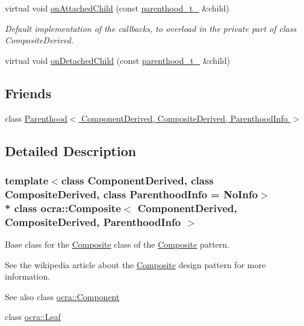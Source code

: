 {\bf }\par
\begin{DoxyCompactItemize}
\item 
virtual void \hyperlink{classocra_1_1Composite_a9937c32827a7c7f3caede800fbe7741e}{on\+Attached\+Child} (const \hyperlink{classocra_1_1Parenthood}{parenthood\+\_\+t\+\_\+} \&child)
\begin{DoxyCompactList}\small\item\em Default implementation of the callbacks, to overload in the private part of class Composite\+Derived. \end{DoxyCompactList}\item 
virtual void \hyperlink{classocra_1_1Composite_a94ec703ff5bf3c94f522648f117c8221}{on\+Detached\+Child} (const \hyperlink{classocra_1_1Parenthood}{parenthood\+\_\+t\+\_\+} \&child)
\end{DoxyCompactItemize}

\subsection*{Friends}
\begin{DoxyCompactItemize}
\item 
class \hyperlink{classocra_1_1Composite_ad71e675afae5fce6263d2d784cd3907a}{Parenthood$<$ Component\+Derived, Composite\+Derived, Parenthood\+Info $>$}
\end{DoxyCompactItemize}


\subsection{Detailed Description}
\subsubsection*{template$<$class Component\+Derived, class Composite\+Derived, class Parenthood\+Info = No\+Info$>$\\*
class ocra\+::\+Composite$<$ Component\+Derived, Composite\+Derived, Parenthood\+Info $>$}

Base class for the \hyperlink{classocra_1_1Composite}{Composite} class of the \hyperlink{classocra_1_1Composite}{Composite} pattern. 

See the wikipedia article about the \hyperlink{classocra_1_1Composite}{Composite} design pattern for more information. \begin{DoxySeeAlso}{See also}
class \hyperlink{classocra_1_1Component}{ocra\+::\+Component} 

class \hyperlink{classocra_1_1Leaf}{ocra\+::\+Leaf}
\end{DoxySeeAlso}

